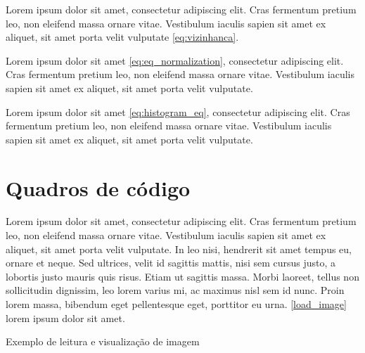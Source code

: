 Lorem ipsum dolor sit amet, consectetur adipiscing elit. Cras fermentum pretium leo, non eleifend massa ornare vitae. Vestibulum iaculis sapien sit amet ex aliquet, sit amet porta velit vulputate \autoref{eq:vizinhanca}.


Lorem ipsum dolor sit amet \autoref{eq:eq_normalization}, consectetur adipiscing elit. Cras fermentum pretium leo, non eleifend massa ornare vitae. Vestibulum iaculis sapien sit amet ex aliquet, sit amet porta velit vulputate.


Lorem ipsum dolor sit amet \autoref{eq:histogram_eq}, consectetur adipiscing elit. Cras fermentum pretium leo, non eleifend massa ornare vitae. Vestibulum iaculis sapien sit amet ex aliquet, sit amet porta velit vulputate.

\chapter{Quadros de código}

Lorem ipsum dolor sit amet, consectetur adipiscing elit. Cras fermentum pretium leo, non eleifend massa ornare vitae. Vestibulum iaculis sapien sit amet ex aliquet, sit amet porta velit vulputate. In leo nisi, hendrerit sit amet tempus eu, ornare et neque. Sed ultrices, velit id sagittis mattis, nisi sem cursus justo, a lobortis justo mauris quis risus. Etiam ut sagittis massa. Morbi laoreet, tellus non sollicitudin dignissim, leo lorem varius mi, ac maximus nisl sem id nunc. Proin lorem massa, bibendum eget pellentesque eget, porttitor eu urna. \autoref{load_image} lorem ipsum dolor sit amet.

\begin{quadro}[H]
    \caption{Exemplo de leitura e visualização de imagem}
    \label{load_image}
    \begin{scriptsize}
    
    \end{scriptsize}
    \raggedright\footnotesize{}
\end{quadro}

